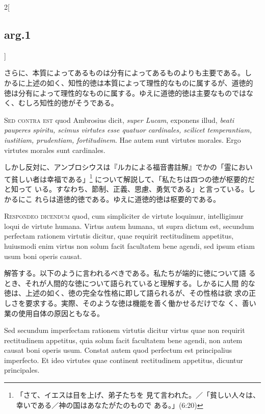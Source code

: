 \documentclass[paper=a4paper,fontsize=10pt,jafontsize=9pt,titlepage]{jlreq}
\begin{document}
\begin{paracol}{2}[\subsection{arg.1}]
\switchcolumn

さらに、本質によってあるものは分有によってあるものよりも主要である。し
かるに上述の如く、知性的徳は本質によって理性的なものに属するが、道徳的
徳は分有によって理性的なものに属する。ゆえに道徳的徳は主要なものではな
く、むしろ知性的徳がそうである。

\switchcolumn*[\subsection{s.c.}]

{\scshape Sed contra est} quod Ambrosius dicit, {\itshape super
Lucam}, exponens illud, {\itshape beati pauperes spiritu, scimus
virtutes esse quatuor cardinales, scilicet temperantiam, iustitiam,
prudentiam, fortitudinem}. Hae autem sunt virtutes morales. Ergo
virtutes morales sunt cardinales.

\switchcolumn

しかし反対に、アンブロシウスは『ルカによる福音書註解』でかの「霊におい
て貧しい者は幸福である」\footnote{「さて、イエスは目を上げ、弟子たちを
見て言われた。／「貧しい人々は、幸いである／神の国はあなたがたのもので
ある。」(6:20)} について解説して、「私たちは四つの徳が枢要的だと知って
いる。すなわち、節制、正義、思慮、勇気である」と言っている。しかるにこ
れらは道徳的徳である。ゆえに道徳的徳は枢要的である。


{\scshape Respondeo dicendum} quod, cum simpliciter de virtute
 loquimur, intelligimur loqui de virtute humana. Virtus autem humana,
 ut supra dictum est, secundum perfectam rationem virtutis dicitur,
 quae requirit rectitudinem appetitus, huiusmodi enim virtus non solum
 facit facultatem bene agendi, sed ipsum etiam usum boni operis
 causat.

\switchcolumn

解答する。以下のように言われるべきである。私たちが端的に徳について語
 るとき、それが人間的な徳について語られていると理解する。しかるに人間
 的な徳は、上述の如く、徳の完全な性格に即して語られるが、その性格は欲
 求の正しさを要求する。実際、そのような徳は機能を善く働かせるだけでな
 く、善い業の使用自体の原因ともなる。

\switchcolumn*

Sed secundum imperfectam rationem virtutis dicitur virtus quae non
 requirit rectitudinem appetitus, quia solum facit facultatem bene
 agendi, non autem causat boni operis usum. Constat autem quod
 perfectum est principalius imperfecto. Et ideo virtutes quae
 continent rectitudinem appetitus, dicuntur principales.


\end{paracol}
\end{document}
